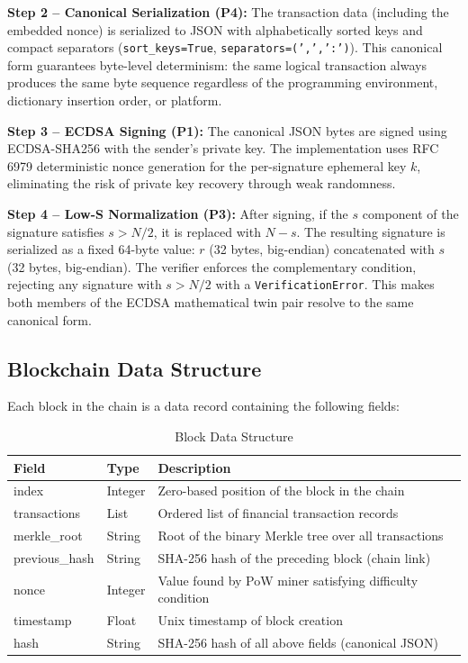 \documentclass[12pt,a4paper]{report}
\begin{document}
\textbf{Step 2 -- Canonical Serialization (P4):} The transaction data (including the
embedded nonce) is serialized to JSON with alphabetically sorted keys and compact separators
(\texttt{sort\_keys=True}, \texttt{separators=(',',':')}). This canonical form guarantees
byte-level determinism: the same logical transaction always produces the same byte sequence
regardless of the programming environment, dictionary insertion order, or platform.

\textbf{Step 3 -- ECDSA Signing (P1):} The canonical JSON bytes are signed using
ECDSA-SHA256 with the sender's private key. The implementation uses RFC 6979 deterministic
nonce generation for the per-signature ephemeral key $k$, eliminating the risk of private
key recovery through weak randomness.

\textbf{Step 4 -- Low-S Normalization (P3):} After signing, if the $s$ component of the
signature satisfies $s > N/2$, it is replaced with $N - s$. The resulting signature is
serialized as a fixed 64-byte value: $r$ (32 bytes, big-endian) concatenated with $s$
(32 bytes, big-endian). The verifier enforces the complementary condition, rejecting any
signature with $s > N/2$ with a \texttt{VerificationError}. This makes both members of
the ECDSA mathematical twin pair resolve to the same canonical form.

\subsection{Blockchain Data Structure}

Each block in the chain is a data record containing the following fields:

\begin{table}[H]
\centering
\caption{Block Data Structure}
\label{tab:blockstruct}
\begin{tabular}{|l|l|p{7cm}|}
\hline
\textbf{Field} & \textbf{Type} & \textbf{Description} \\
\hline
index & Integer & Zero-based position of the block in the chain \\
\hline
transactions & List & Ordered list of financial transaction records \\
\hline
merkle\_root & String & Root of the binary Merkle tree over all transactions \\
\hline
previous\_hash & String & SHA-256 hash of the preceding block (chain link) \\
\hline
nonce & Integer & Value found by PoW miner satisfying difficulty condition \\
\hline
timestamp & Float & Unix timestamp of block creation \\
\hline
hash & String & SHA-256 hash of all above fields (canonical JSON) \\
\hline
\end{tabular}
\end{table}
\end{document}
